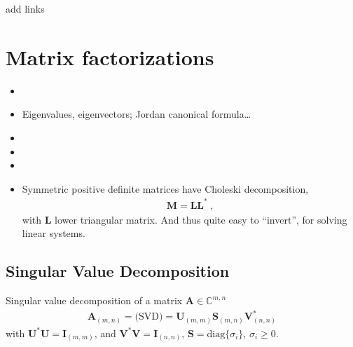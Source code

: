 \documentclass[letterpaper,10pt,english]{jupyterBook}
\begin{document}
\sphinxAtStartPar
{} add links

\sphinxstepscope


\chapter{Matrix factorizations}
\label{\detokenize{ch/linear-algebra/matrix-factorization:matrix-factorizations}}\label{\detokenize{ch/linear-algebra/matrix-factorization:math-matrix-factorization}}\label{\detokenize{ch/linear-algebra/matrix-factorization::doc}}\begin{itemize}
\item {} 
\sphinxAtStartPar
{}

\item {} 
\sphinxAtStartPar
{} Eigenvalues, eigenvectors; Jordan canonical formula…

\item {} 
\sphinxAtStartPar
{}

\item {} 
\sphinxAtStartPar
{}

\item {} 
\sphinxAtStartPar
{}

\item {} 
\sphinxAtStartPar
{} Symmetric positive definite matrices have Choleski decomposition,
\begin{equation*}
\begin{split}\mathbf{M} = \mathbf{L} \mathbf{L}^* \ ,\end{split}
\end{equation*}
\sphinxAtStartPar
with \(\mathbf{L}\) lower triangular matrix. And thus quite easy to “invert”, for solving linear systems.

\end{itemize}

\sphinxstepscope


\section{Singular Value Decomposition}
\label{\detokenize{ch/linear-algebra/svd:singular-value-decomposition}}\label{\detokenize{ch/linear-algebra/svd:math-svd}}\label{\detokenize{ch/linear-algebra/svd::doc}}
\sphinxAtStartPar
Singular value decomposition of a matrix \(\mathbf{A} \in \mathbb{C}^{m,n}\)
\begin{equation*}
\begin{split}\mathbf{A}_{(m,n)} = \text{(SVD)} = \mathbf{U}_{(m,m)} \mathbf{S}_{(m,n)} \mathbf{V}^*_{(n,n)}\end{split}
\end{equation*}
\sphinxAtStartPar
with \(\mathbf{U}^* \mathbf{U} = \mathbf{I}_{(m,m)}\), and \(\mathbf{V}^* \mathbf{V} = \mathbf{I}_{(n,n)}\), \(\mathbf{S} = \text{diag}\{ \sigma_i \}\), \(\sigma_i \ge 0\).
\end{document}
